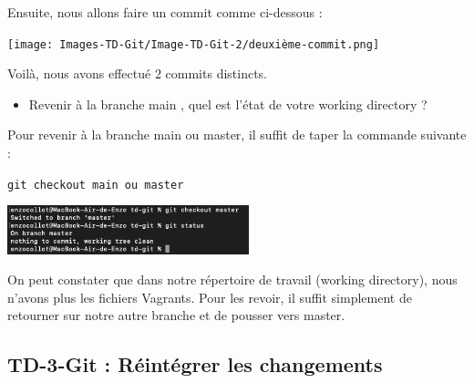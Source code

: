 \documentclass[12pt]{article}
\begin{document}
\vspace{0.3cm}

Ensuite, nous allons faire un commit comme ci-dessous :

\vspace{0.3cm}

\begin{center}
  \texttt{[image: Images-TD-Git/Image-TD-Git-2/deuxième-commit.png]}
\end{center}

\vspace{0.3cm}

Voilà, nous avons effectué 2 commits distincts.

\vspace{0.3cm}

\begin{itemize}
  \item Revenir à la branche main , quel est l'état de votre working directory ?
\end{itemize}

\vspace{0.3cm}

Pour revenir à la branche main ou master, il suffit de taper la commande suivante :

\texttt{git checkout main ou master}

\vspace{0.3cm}

\begin{center}
  \includegraphics[width=7cm]{Images-TD-Git/Image-TD-Git-2/git-checkout-master.png}
\end{center}

\vspace{0.3cm}

On peut constater que dans notre répertoire de travail (working directory), nous n'avons plus les fichiers Vagrants. Pour les revoir, il suffit simplement de retourner sur notre autre branche et de pousser vers master.


\newpage

\subsection{TD-3-Git : Réintégrer les changements}

\vspace{0.3cm}
\end{document}
